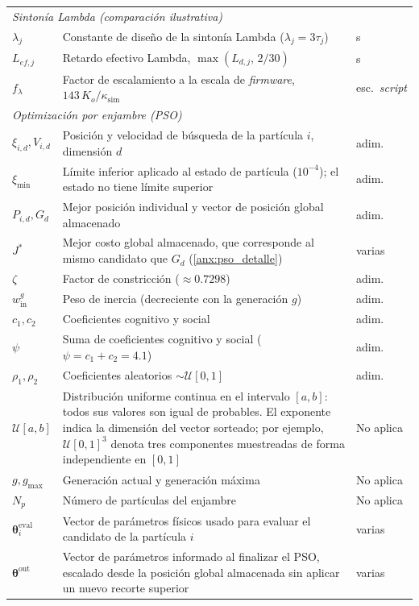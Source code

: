 \begin{appendices}
{\begin{longtable}{p{2.7cm} p{8.5cm} p{2.2cm}}
\midrule \multicolumn{3}{l}{\textit{Sintonía Lambda (comparación ilustrativa)}} \\
$\lambda_j$ & Constante de diseño de la sintonía Lambda ($\lambda_j=3\tau_j$) & s \\
$L_{ef,j}$ & Retardo efectivo Lambda, $\max(L_{d,j},\,2/30)$ & s \\
$f_{\lambda}$ & Factor de escalamiento a la escala de \textit{firmware}, $143\,K_o/\kappa_{\mathrm{sim}}$ & esc.\ \textit{script} \\
\multicolumn{3}{l}{\textit{Optimización por enjambre (PSO)}}\\
$\xi_{i,d},V_{i,d}$ & Posición y velocidad de búsqueda de la partícula $i$, dimensión $d$ & adim. \\
$\xi_{\min}$ & Límite inferior aplicado al estado de partícula ($10^{-4}$); el estado no tiene límite superior & adim. \\
$P_{i,d},G_d$ & Mejor posición individual y vector de posición global almacenado & adim. \\
$J^*$ & Mejor costo global almacenado, que corresponde al mismo candidato que $G_d$ (\ref{anx:pso_detalle}) & varias \\
$\zeta$ & Factor de constricción ($\approx0.7298$) & adim. \\
$w_{\mathrm{in}}^{g}$ & Peso de inercia (decreciente con la generación $g$) & adim. \\
$c_1,c_2$ & Coeficientes cognitivo y social & adim. \\
$\psi$ & Suma de coeficientes cognitivo y social ($\psi=c_1+c_2=4.1$) & adim. \\
$\rho_1,\rho_2$ & Coeficientes aleatorios $\sim\mathcal{U}[0,1]$ & adim. \\
$\mathcal{U}[a,b]$ & Distribución uniforme continua en el intervalo $[a,b]$: todos sus valores son igual de probables. El exponente indica la dimensión del vector sorteado; por ejemplo, $\mathcal{U}[0,1]^3$ denota tres componentes muestreadas de forma independiente en $[0,1]$ & No aplica \\
$g,g_{\max}$ & Generación actual y generación máxima & No aplica \\
$N_p$ & Número de partículas del enjambre & No aplica \\
$\boldsymbol{\theta}_i^{\mathrm{eval}}$ & Vector de parámetros físicos usado para evaluar el candidato de la partícula $i$ & varias \\
$\boldsymbol{\theta}^{\mathrm{out}}$ & Vector de parámetros informado al finalizar el PSO, escalado desde la posición global almacenada sin aplicar un nuevo recorte superior & varias \\

\end{longtable}}
\end{appendices}
